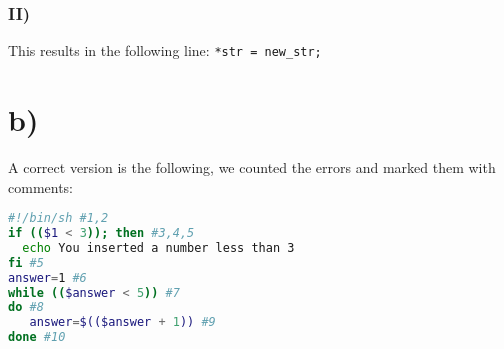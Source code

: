 \documentclass[12pt, a4paper]{article}
\begin{document}
\subsubsection*{II)}
This results in the following line: \verb|*str = new_str;|
\section*{b)}
A correct version is the following, we counted the errors and marked them with comments:
\begin{lstlisting}[language=sh]
#!/bin/sh #1,2
if (($1 < 3)); then #3,4,5
  echo You inserted a number less than 3
fi #5
answer=1 #6
while (($answer < 5)) #7
do #8
   answer=$(($answer + 1)) #9
done #10
\end{lstlisting}
\end{document}
